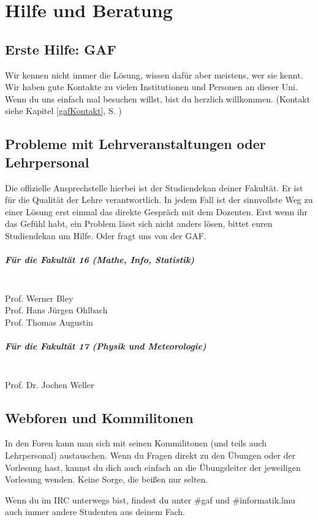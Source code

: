 ﻿
\chapter{Hilfe und Beratung}

\section{Erste Hilfe: GAF}

Wir kennen nicht immer die Lösung, wissen dafür aber meistens, wer sie
kennt. Wir haben gute Kontakte zu vielen Institutionen und Personen an
dieser Uni. Wenn du uns einfach mal besuchen willst, bist du herzlich
willkommen. (Kontakt siehe Kapitel \ref{gafKontakt}, S. \pageref{gafKontakt})

\section{Probleme mit Lehrveranstaltungen oder Lehrpersonal}

Die offizielle Ansprechstelle hierbei ist der Studiendekan deiner
Fakultät. Er ist für die Qualität der Lehre verantwortlich. In jedem
Fall ist der sinnvollste Weg zu einer Lösung erst einmal das direkte
Gespräch mit dem Dozenten. Erst wenn ihr das Gefühl habt, ein Problem
lässt sich nicht anders lösen, bittet euren Studiendekan um
Hilfe. Oder fragt uns von der GAF.

\paragraph{Für die Fakultät 16 (Mathe, Info, Statistik)}\hfill\\
Prof. Werner Bley\\ %
Prof. Hans Jürgen Ohlbach\\
Prof. Thomas Augustin %

\paragraph{Für die Fakultät 17 (Physik und Meteorologie)}\hfill\\
Prof. Dr. Jochen Weller

\section{Webforen und Kommilitonen}

In den Foren kann man sich mit seinen Kommilitonen
(und teils auch Lehrpersonal) austauschen. Wenn du Fragen direkt zu den
Übungen oder der Vorlesung hast, kannst du dich auch einfach an die
Übungsleiter der jeweiligen Vorlesung wenden. Keine Sorge, die beißen nur
selten.
\begin{urlList}
\end{urlList}
Wenn du im IRC unterwegs bist, findest du unter \#gaf und \#informatik.lmu
auch immer andere Studenten aus deinem Fach.

